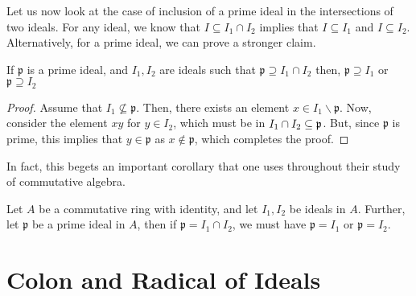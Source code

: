 Let us now look at the case of inclusion of a prime ideal in the intersections of two ideals. For any ideal, we know that $I \subseteq I_{1} \cap I_{2}$ implies that $I \subseteq I_1$ and $I \subseteq I_2$. Alternatively, for a prime ideal, we can prove a stronger claim.
\begin{proposition}\label{prop: prime-contained-one}
    If $\mathfrak{p}$ is a prime ideal, and $I_{1}, I_{2}$ are ideals such that $\mathfrak{p} \supseteq I_{1} \cap I_{2}$ then, $\mathfrak{p} \supseteq I_{1}$ or $\mathfrak{p} \supseteq I_{2}$
\end{proposition}
\begin{proof}
    Assume that $I_{1} \nsubseteq \mathfrak{p}$. Then, there exists an element 
    $x \in I_{1} \backslash \mathfrak{p}$. Now, consider the element $xy$ for $y \in I_2$, which must be in $I_1 \cap I_2 \ss \mathfrak{p}$. But, since $\mathfrak{p}$ is prime, this implies that $y \in \mathfrak{p}$ as $x \notin \mathfrak{p}$, which completes the proof.
\end{proof} 
In fact, this begets an important corollary that one uses throughout their study of commutative algebra.
\begin{corollary}\label{cor: prime-equals-one}
    Let $A$ be a commutative ring with identity, and let $I_1, I_2$ be ideals in $A$. Further, let $\mathfrak{p}$ be a prime ideal in $A$, then if $\mathfrak{p}=I_{1} \cap I_{2}$, we must have $\mathfrak{p}=I_{1}$ or $\mathfrak{p}=I_{2}$.
\end{corollary}

\section{Colon and Radical of Ideals}

